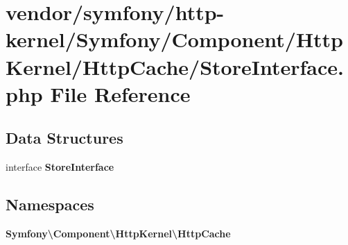 \section{vendor/symfony/http-\/kernel/\+Symfony/\+Component/\+Http\+Kernel/\+Http\+Cache/\+Store\+Interface.php File Reference}
\label{_store_interface_8php}
\subsection*{Data Structures}
\begin{DoxyCompactItemize}
\item 
interface {\bf Store\+Interface}
\end{DoxyCompactItemize}
\subsection*{Namespaces}
\begin{DoxyCompactItemize}
\item 
 {\bf Symfony\textbackslash{}\+Component\textbackslash{}\+Http\+Kernel\textbackslash{}\+Http\+Cache}
\end{DoxyCompactItemize}
